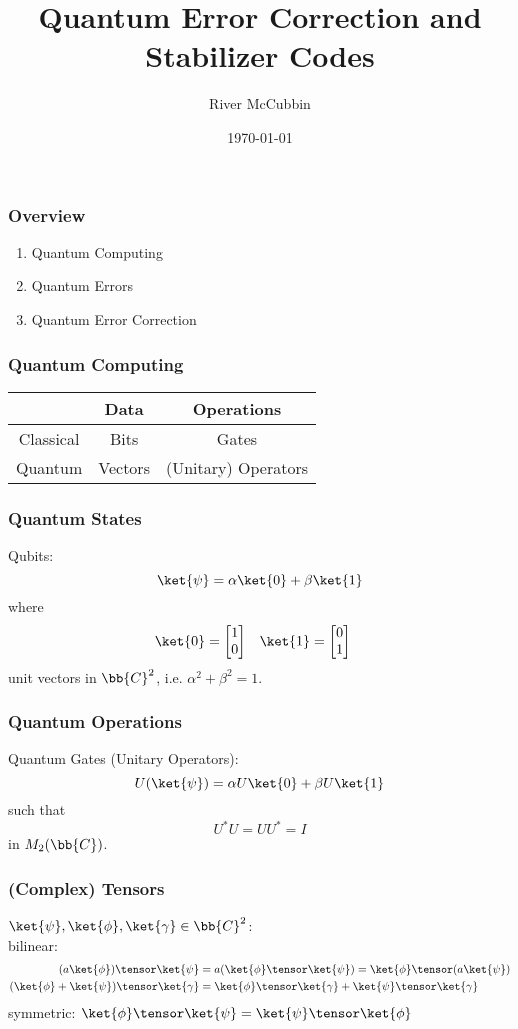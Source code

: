 \documentclass[notheorems]{beamer}
\title{Quantum Error Correction and Stabilizer Codes}
\author{River McCubbin}
\date{\today}
\begin{document}
\frame{\titlepage}

\begin{frame}
\frametitle{Overview}
\begin{enumerate}
\item Quantum Computing \pause
\item Quantum Errors \pause
\item Quantum Error Correction
\end{enumerate}
\end{frame}

\begin{frame}
\frametitle{Quantum Computing}
\begin{center}
\begin{tabular}{c|c|c}
& Data & Operations\\
\hline
Classical & Bits & Gates\\
\hline
Quantum & Vectors & (Unitary) Operators
\end{tabular}
\end{center}
\end{frame}

\begin{frame}
\frametitle{Quantum States}
Qubits:
$$\ket{\psi} = \alpha \ket{0} + \beta \ket{1}$$
where
\begin{align*}
\ket{0} &= \begin{bmatrix} 1 \\ 0 \end{bmatrix} & \ket{1} &= \begin{bmatrix} 0 \\ 1 \end{bmatrix}
\end{align*}
unit vectors in $\bb{C}^2$, i.e. $\alpha^2 + \beta^2 = 1$.
\end{frame}

\begin{frame}
\frametitle{Quantum Operations}
Quantum Gates (Unitary Operators):
        $$ U(\ket{\psi}) = \alpha U \ket{0} + \beta U \ket{1}$$
such that
        $$U^*U = UU^* = I$$
in $M_2(\bb{C})$.
\end{frame}

\begin{frame}
\frametitle{(Complex) Tensors}
$\ket{\psi}, \ket{\phi}, \ket{\gamma} \in \bb{C}^2$:\\ \pause
bilinear: 
        \begin{align*}
        (a \ket{\phi}) \tensor \ket{\psi} &= a ( \ket{\phi} \tensor \ket{\psi}) = \ket{\phi} \tensor (a \ket{\psi})\\
        (\ket{\phi} + \ket{\psi}) \tensor \ket{\gamma} &= \ket{\phi} \tensor \ket{\gamma} + \ket{\psi} \tensor \ket{\gamma}
        \end{align*} \pause
symmetric: $\ket{\phi} \tensor \ket{\psi} = \ket{\psi} \tensor \ket{\phi}$
\end{frame}
\end{document}
